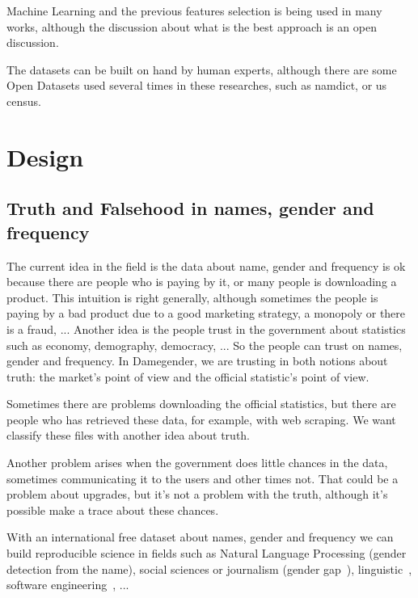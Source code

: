 \documentclass[a4paper]{article}
\begin{document}
Machine Learning and the previous features selection is being used in
many works, although the discussion about what is the best approach is
an open discussion.

The datasets can be built on hand by human experts, although there are
some Open Datasets used several times in these researches, such as
namdict, or us census.

\section{Design}
\label{sec:design}

\subsection{Truth and Falsehood in names, gender and frequency}
\label{sec:truthandfalsehood}

The current idea in the field is the data about name, gender and
frequency is ok because there are people who is paying by it, or many
people is downloading a product. This intuition is right generally,
although sometimes the people is paying by a bad product due to a good
marketing strategy, a monopoly or there is a fraud, ... Another idea
is the people trust in the government about statistics such as economy,
demography, democracy, ... So the people can trust on names, gender
and frequency. In Damegender, we are trusting in both notions about
truth: the market's point of view and the official statistic's
point of view.

Sometimes there are problems downloading the official statistics, but
there are people who has retrieved these data, for example, with
web scraping. We want classify these files with another idea about
truth.

Another problem arises when the government does little chances in the
data, sometimes communicating it to the users and other times
not. That could be a problem about upgrades, but it's not a problem
with the truth, although it's possible make a trace about these
chances.

With an international free dataset about names, gender and frequency
we can build reproducible science in fields such as Natural Language
Processing (gender detection from the name), social sciences or
journalism (gender
gap~\cite{holman2018gender,mislove2011understanding,niemi2017gendered,de2014genero}),
linguistic~\cite{lawson2005russian,krueger1962mongolian,van2020gender,agyekum2006sociolinguistic,fraser1987lexicon},
software engineering~\cite{vasilescu2012gender}, ...
\end{document}
